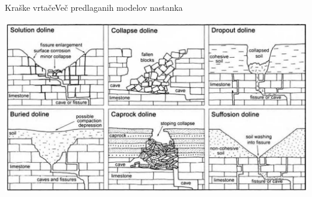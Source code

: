 \documentclass{beamer}
\begin{document}
\begin{frame}{Kraške vrtače}{Več predlaganih modelov nastanka}
  \begin{center}
    \hspace*{-0.075\textwidth}\includegraphics[width=1.15\textwidth]{slike/nastanek}
  \end{center}
\end{frame}

\end{document}
